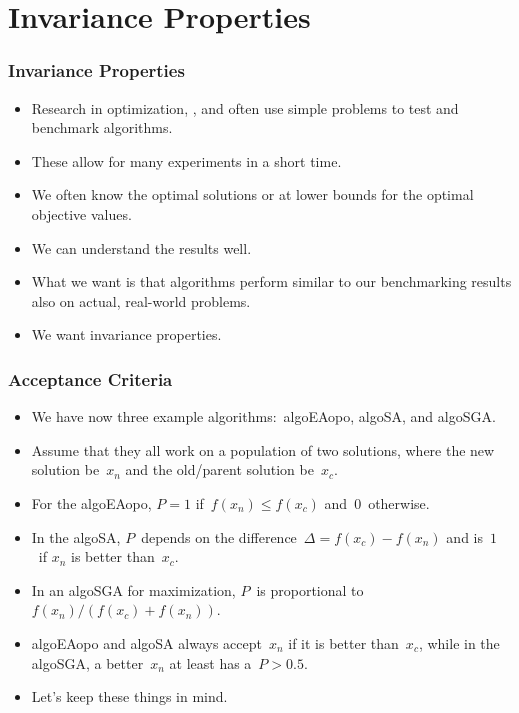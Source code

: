 \documentclass[aspectratio=169,mathserif,notheorems]{beamer}%
\begin{document}
\section{Invariance Properties}%
%
\begin{frame}%
\frametitle{Invariance Properties}%
\begin{itemize}%
\item Research in optimization, , and  often use simple problems to test and benchmark algorithms.%
\item<2-> These allow for many experiments in a short time.%
\item<3-> We often know the optimal solutions or at lower bounds for the optimal objective values.%
\item<4-> We can understand the results well.%
\item<5-> What we want is that algorithms perform similar to our benchmarking results also on actual, real-world problems.%
\item<6-> \alert{We want invariance properties.}\cite{OAAH2017IGOAAUPVIP,HA2014PDOCSSFTTP,JA2010LLCOTSIMMLEAOMFIRFLPS}%
\end{itemize}%
\end{frame}%
%
\begin{frame}%
\frametitle{Acceptance Criteria}%
\begin{itemize}%
\item We have now three example algorithms:~\gls{algoEAopo}, \gls{algoSA}, and \gls{algoSGA}.%
%
\item<2-> Assume that they all work on a population of two solutions, where the new solution be~$x_n$ and the old/parent solution be~$x_c$.%
%
\item<3-> For the \gls{algoEAopo}, $P=1$ if~$f(x_n)\leq f(x_c)$ and~$0$~otherwise.%
%
\item<4-> In the \gls{algoSA}, $P$~depends on the difference~$\Delta=f(x_c)-f(x_n)$ and is~$1$~if $x_n$ is better than~$x_c$.%
%
\item<5-> In an \gls{algoSGA} for maximization, $P$~is proportional to~$f(x_n)/(f(x_c)+f(x_n))$.%
%
\item<7-> \gls{algoEAopo} and \gls{algoSA} always accept~$x_n$ if it is better than~$x_c$, while in the \gls{algoSGA}, a better~$x_n$ at least has a~$P>0.5$.%
%
\item<8-> Let's keep these things in mind.%
\end{itemize}%
\end{frame}%
\end{document}
